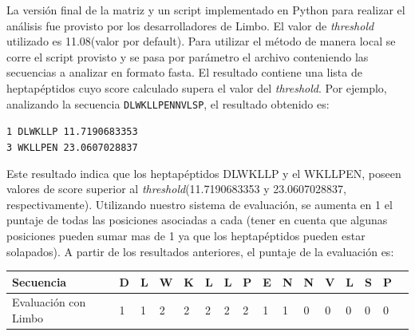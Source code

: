 La versión final de la matriz y un script implementado en Python para realizar el análisis fue provisto por los desarrolladores de Limbo.
El valor de \textit{threshold} utilizado es 11.08(valor por default). Para utilizar el método de manera local se corre el script provisto y se pasa por parámetro el archivo conteniendo las secuencias a analizar en formato fasta.
El resultado contiene una lista de heptapéptidos cuyo score calculado supera el valor del \textit{threshold}.
Por ejemplo, analizando la secuencia \texttt{DLWKLLPENNVLSP}, el resultado obtenido es:

\noindent
\texttt{1 DLWKLLP 11.7190683353}   \\
\texttt{3 WKLLPEN 23.0607028837} 

Este resultado indica que los heptapéptidos DLWKLLP y el WKLLPEN, poseen valores de score superior al \textit{threshold}(11.7190683353 y 23.0607028837, respectivamente).
Utilizando nuestro sistema de evaluación, se aumenta en 1 el puntaje de todas las posiciones asociadas a cada (tener en cuenta que algunas posiciones pueden sumar mas de 1 ya que los heptapéptidos pueden estar solapados).
A partir de los resultados anteriores, el puntaje de la evaluación es:

\vspace{0.5cm}
\noindent
\begin{tabular}{llllllllllllllll} 
\hline      		
Secuencia & \textbf{D} & \textbf{L} & \textbf{W} & \textbf{K} & \textbf{L} & \textbf{L} & \textbf{P} & \textbf{E} & \textbf{N} & \textbf{N} & \textbf{V} & \textbf{L} & \textbf{S} & \textbf{P} \\ \hline
Evaluación con Limbo & 1 & 1 & 2 & 2 & 2 & 2 & 2 & 1 & 1 & 0 & 0 & 0 & 0 & 0 \\ \hline
\end{tabular}







